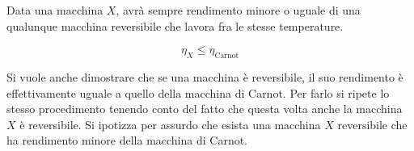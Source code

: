 \begin{figure}[htpb]
\end{figure}
\FloatBarrier
Data una macchina $X$, avrà sempre rendimento minore o uguale di una qualunque macchina reversibile che lavora fra le stesse temperature.

\[
	\boxed{\eta_X \le \eta_{\text{Carnot} }}
\]

Si vuole anche dimostrare che se una macchina è reversibile, il suo rendimento è effettivamente uguale a quello della macchina di Carnot. Per farlo si ripete lo stesso procedimento tenendo conto del fatto che questa volta anche la macchina $X$ è reversibile. Si ipotizza per assurdo che esista una macchina $X$ reversibile che ha rendimento minore della macchina di Carnot.

